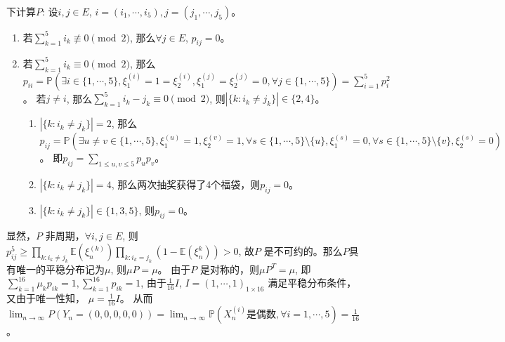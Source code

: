 \documentclass{ctexart}
\begin{document}
\begin{solution}
\begin{enumerate}
      下计算\(P\):
      设\(i,j \in E\), \(i=(i_1,\cdots,i_5),j=(j_1,\cdots,j_5)\)。
      \begin{enumerate}
        \item 若\(\sum_{k=1}^{5} i_k \not\equiv 0 \pmod{2}\), 那么\(\forall j \in E\), \(p_{ij}=0\)。
        \item 若\(\sum_{k=1}^{5} i_k \equiv 0 \pmod{2}\), 那么\(p_{ii}=\mathbb{P}(\exists i \in \{1,\cdots,5\}, \xi_1^{(i)}=1=\xi_2^{(i)}, \xi_1^{(j)}=\xi_2^{(j)}=0, \forall j \in \{1,\cdots,5\})=\sum_{i=1}^{5} p_i^2\)。
          若\(j \neq i\), 那么\(\sum_{k=1}^{5} i_k-j_k \equiv 0 \pmod{2}\), 则\(|\{k:i_k \neq j_k\}|\in \{2,4\}\)。
          \begin{enumerate}
            \item \(|\{k:i_k \neq j_k\}|=2\), 那么\(p_{ij}=\mathbb{P}(\exists u \neq v \in \{1,\cdots,5\}, \xi_1^{(u)} =1,\xi_2^{(v)}=1, \forall s \in \{1,\cdots,5\} \setminus \{u\}, \xi_1^{(s)}=0 ,\forall s \in \{1,\cdots,5\} \setminus \{v\}, \xi_2^{(s)}=0)\)。
              即\(p_{ij}=\sum_{1 \leq u,v \leq 5}p_up_v\)。
            \item \(|\{k:i_k \neq j_k\}|=4\), 那么两次抽奖获得了4个福袋，则\(p_{ij}=0\)。
            \item \(|\{k:i_k \neq j_k\}| \in \{1,3,5\}\), 则\(p_{ij}=0\)。
          \end{enumerate}
      \end{enumerate}
      显然，\(P\) 非周期，\(\forall i,j \in E\), 则\(p_{ij}^{5} \geq \prod_{k:i_k \neq j_k} \mathbb{E}(\xi_n^{(k)})\prod_{k:i_k = j_k} (1-\mathbb{E}(\xi_n^{k})) >0\),
      故\(P\) 是不可约的。那么\(P\)具有唯一的平稳分布记为\(\mu\), 则\(\mu P =\mu\)。
      由于\(P\) 是对称的，则\(\mu P^{T} = \mu\), 即\(\sum_{k=1}^{16} \mu_k p_{ik}=1,\sum_{k=1}^{16} p_{ik}=1\),
      由于\(\frac{1}{16}I\), \(I=(1,\cdots,1)_{1 \times 16}\) 满足平稳分布条件，又由于唯一性知，
      \(\mu=\frac{1}{16}I\)。
      从而\(\lim_{n \to \infty}P(Y_n=(0,0,0,0,0))=\lim_{n \to \infty}\mathbb{P}(X_n^{(i)} \text{是偶数}, \forall i=1,\cdots,5)=\frac{1}{16}\)。
  \end{enumerate}

\end{solution}
\pagebreak
\end{document}
